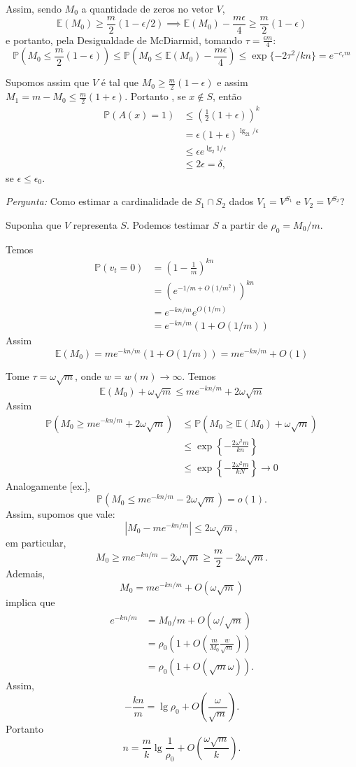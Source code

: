 Assim, sendo $M_0$ a quantidade de zeros no vetor $V$,
\[\mathbb{E}(M_0)\ge \frac{m}{2} (1-\epsilon/2) \implies \mathbb{E}(M_0)-\frac{m\epsilon}{4}\ge \frac{m}{2} (1-\epsilon)\]
e portanto, pela Desigualdade de McDiarmid, tomando $\tau = \frac{\epsilon m}{4}$:
\[\mathbb{P}(M_0 \le \frac{m}{2} (1-\epsilon)) \le  \mathbb{P}\left(M_0 \le \mathbb{E}(M_0)-\frac{m\epsilon}{4}\right)\le \exp\{-2\tau^2/kn\} = e^{-c_\epsilon m}\]

Supomos assim que $V$ \'e tal que $M_0\ge \frac{m}{2}(1-\epsilon)$ e assim $M_1 = m-M_0 \le \frac{m}{2}(1+\epsilon)$. 
Portanto , se $x\notin S$, ent\~ao 
\begin{align*}
\mathbb{P}(A(x)=1) &\le \left( \frac{1}{2} (1+\epsilon)\right)^k\\
					&=\epsilon(1+\epsilon)^{\lg_21/\epsilon}\\
					&\le \epsilon e^{\lg_2 1/\epsilon}\\
					&\le 2\epsilon = \delta,
\end{align*}
se $\epsilon \le \epsilon_0$.

\textit{Pergunta:} Como estimar a cardinalidade de $S_1\cap S_2$ dados $V_1=V^{S_1}$ e $V_2=V^{S_2}$?

Suponha que $V$ representa $S$. Podemos testimar $S$ a partir de $\rho_0 = M_0/m$.

Temos
\begin{align*}
\mathbb{P}(v_t=0)&= \left(1-\frac{1}{m}\right)^{kn}\\
                    &= \left(e^{-1/m+O(1/m^2)}\right)^{kn}\\
                    &=e^{-kn/m}e^{O({1/m})}\\
                    &=e^{-kn/m}(1+O(1/m))
\end{align*} 
Assim
\[\mathbb{E}(M_0) = me^{-kn/m}(1+O(1/m))=me^{-kn/m} + O(1)\]

Tome $\tau = \omega\sqrt{m}$, onde $w = w(m) \to \infty$. Temos
\[\mathbb{E}(M_0) + \omega\sqrt{m} \le me^{-kn/m} + 2\omega\sqrt m\]
Assim
\begin{align*}
\mathbb{P}(M_0 \ge me^{-kn/m} + 2\omega\sqrt m)&\le \mathbb{P}(M_0 \ge \mathbb{E}(M_0) + \omega\sqrt{m})\\
											   &\le \exp \left\{-\frac{2\omega^2m}{kn}\right\}\\
											   &\le \exp \left\{-\frac{2\omega^2m}{kN}\right\} \to 0
\end{align*}
Analogamente [ex.],
\[\mathbb{P}(M_0 \le me^{-kn/m} - 2\omega\sqrt m)= o(1).\]
Assim, supomos que vale:
\[|M_0 - me^{-kn/m}|\le 2\omega\sqrt{m},\]
em particular,
\[M_0 \ge me^{-kn/m} - 2\omega\sqrt m \ge \frac{m}{2}-2\omega\sqrt m.\]
Ademais,
\[M_0 = me^{-kn/m} + O(\omega\sqrt m)\]
implica que 
\begin{align*}
e^{-kn/m} &= M_0/m + O(\omega/\sqrt m)\\
		  &=\rho_0\left( 1 + O\left(\frac{m}{M_0}\frac{w}{\sqrt m}\right)\right)\\
		  &=\rho_0\left( 1 + O(\sqrt m \omega)\right). 
\end{align*}
Assim,
\[-\frac{kn}{m} = \lg \rho_0 + O\left(\frac{\omega}{\sqrt m}\right).\]
Portanto
\[n = \frac{m}{k} \lg \frac{1}{\rho_0} + O\left(\frac{\omega \sqrt m }{k}\right).\]

